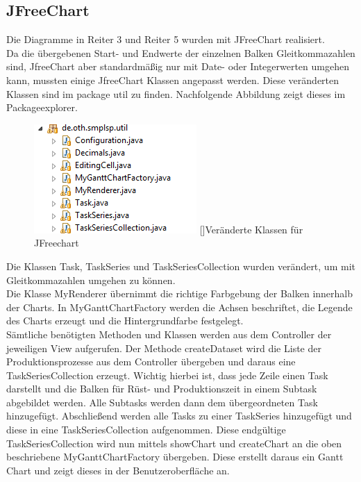 \documentclass[12pt,a4paper, listof=entryprefix, bibliography=totocnumbered,toc=listofnumbered,lof=listofnumbered]{scrartcl}
\begin{document}
\subsection{JFreeChart}
Die Diagramme in Reiter 3 und Reiter 5 wurden mit JFreeChart realisiert. 
\\
Da die übergebenen Start- und Endwerte der einzelnen Balken Gleitkommazahlen sind, JfreeChart aber standardmäßig nur mit Date- oder Integerwerten umgehen kann, mussten einige JfreeChart Klassen angepasst werden. Diese veränderten Klassen sind im package util zu finden. Nachfolgende Abbildung zeigt dieses im Packageexplorer.

\begin{figure}[H]
	\centering
	\includegraphics[width=0.5\linewidth]{Bilder/util_package.png} 
	[]{Veränderte Klassen für JFreechart}
	\label{fig:osgi}
\end{figure}

Die Klassen Task, TaskSeries und TaskSeriesCollection wurden verändert, um mit Gleitkommazahlen umgehen zu können. 
\\
Die Klasse MyRenderer übernimmt die richtige Farbgebung der Balken innerhalb der Charts.
In MyGanttChartFactory werden die Achsen beschriftet, die Legende des Charts erzeugt und die Hintergrundfarbe festgelegt.
\\
Sämtliche benötigten Methoden und Klassen werden aus dem Controller der jeweiligen View aufgerufen. Der Methode createDataset wird die Liste der Produktionsprozesse aus dem Controller übergeben und daraus eine TaskSeriesCollection erzeugt. Wichtig hierbei ist, dass jede Zeile einen Task darstellt und die Balken für Rüst- und Produktionszeit in einem Subtask abgebildet werden. Alle Subtasks werden dann dem übergeordneten Task hinzugefügt. Abschließend werden alle Tasks zu einer TaskSeries hinzugefügt und diese in eine TaskSeriesCollection aufgenommen. Diese endgültige TaskSeriesCollection wird nun mittels showChart und createChart an die oben beschriebene MyGanttChartFactory übergeben. Diese erstellt daraus ein Gantt Chart und zeigt dieses in der Benutzeroberfläche an.
\end{document}
